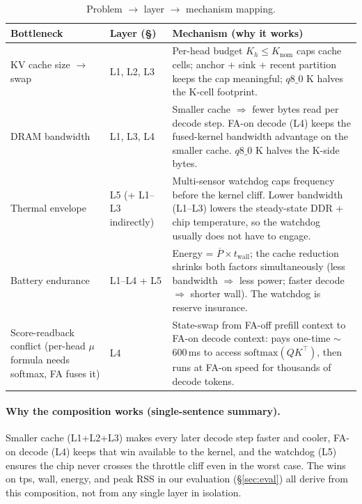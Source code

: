 \documentclass[sigconf, anonymous=false, screen=true]{acmart}
\begin{document}
\begin{table}[t]
\caption{Problem $\to$ layer $\to$ mechanism mapping.}
\label{tab:problem-solution}
\centering
\small
\begin{tabular}{p{} p{} p{}}
\toprule
\textbf{Bottleneck} & \textbf{Layer (\S)} & \textbf{Mechanism (why it works)} \\
\midrule
KV cache size $\to$ swap & L1, L2, L3 & Per-head budget $K_h \le K_{\text{nom}}$ caps cache cells; anchor + sink + recent partition keeps the cap meaningful; $q8\_0$ K halves the K-cell footprint. \\
\midrule
DRAM bandwidth & L1, L3, L4 & Smaller cache $\Rightarrow$ fewer bytes read per decode step. FA-on decode (L4) keeps the fused-kernel bandwidth advantage on the smaller cache. $q8\_0$ K halves the K-side bytes. \\
\midrule
Thermal envelope & L5 (+ L1--L3 indirectly) & Multi-sensor watchdog caps frequency before the kernel cliff. Lower bandwidth (L1--L3) lowers the steady-state DDR + chip temperature, so the watchdog usually does not have to engage. \\
\midrule
Battery endurance & L1--L4 + L5 & Energy = $\overline{P} \times t_{\text{wall}}$; the cache reduction shrinks both factors simultaneously (less bandwidth $\Rightarrow$ less power; faster decode $\Rightarrow$ shorter wall). The watchdog is reserve insurance. \\
\midrule
Score-readback conflict (per-head $\mu$ formula needs softmax, FA fuses it) & L4 & State-swap from FA-off prefill context to FA-on decode context: pays one-time $\sim$600\,ms to access $\mathrm{softmax}(QK^\top)$, then runs at FA-on speed for thousands of decode tokens. \\
\bottomrule
\end{tabular}
\end{table}

\paragraph{Why the composition works (single-sentence summary).} Smaller cache (L1+L2+L3) makes every later decode step faster and cooler, FA-on decode (L4) keeps that win available to the kernel, and the watchdog (L5) ensures the chip never crosses the throttle cliff even in the worst case. The wins on tps, wall, energy, and peak RSS in our evaluation (\S\ref{sec:eval}) all derive from this composition, not from any single layer in isolation.
\end{document}
